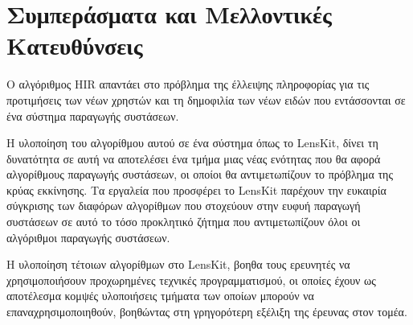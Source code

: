 \chapter{Συμπεράσματα και Μελλοντικές Κατευθύνσεις}
\label{Chapter5}
Ο αλγόριθμος {\en HIR} απαντάει στο πρόβλημα της έλλειψης πληροφορίας για τις προτιμήσεις των νέων χρηστών και τη δημοφιλία των νέων ειδών που εντάσσονται σε ένα σύστημα παραγωγής συστάσεων. \par
Η υλοποίηση του αλγορίθμου αυτού σε ένα σύστημα όπως το {\en LensKit}, δίνει τη δυνατότητα σε αυτή να αποτελέσει ένα τμήμα μιας νέας ενότητας που θα αφορά αλγορίθμους παραγωγής συστάσεων, οι οποίοι θα αντιμετωπίζουν το πρόβλημα της κρύας εκκίνησης. Τα εργαλεία που προσφέρει το {\en LensKit} παρέχουν την ευκαιρία σύγκρισης των διαφόρων αλγορίθμων που στοχεύουν στην ευφυή παραγωγή συστάσεων σε αυτό το τόσο προκλητικό ζήτημα που αντιμετωπίζουν όλοι οι αλγόριθμοι παραγωγής συστάσεων.\par
Η υλοποίηση τέτοιων αλγορίθμων στο {\en LensKit}, βοηθα τους ερευνητές να χρησιμοποιήσουν προχωρημένες τεχνικές προγραμματισμού, οι οποίες έχουν ως αποτέλεσμα κομψές υλοποιήσεις τμήματα των οποίων μπορούν να επαναχρησιμοποιηθούν, βοηθώντας στη γρηγορότερη εξέλιξη της έρευνας στον τομέα.